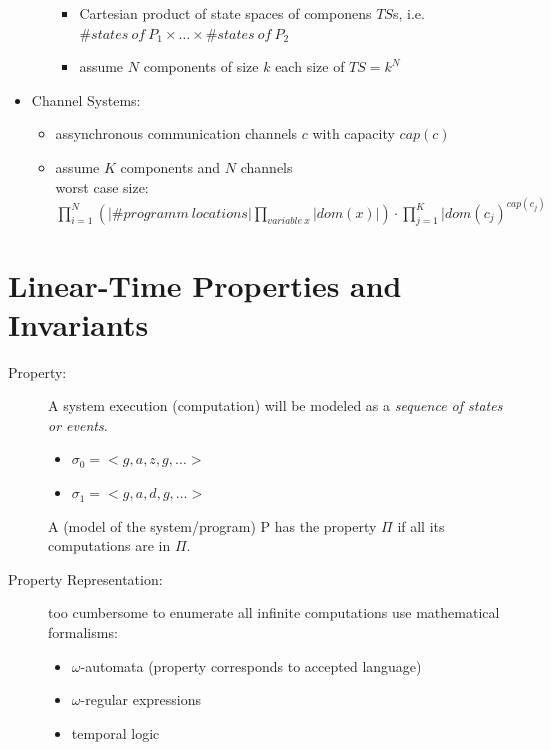 \documentclass[a4paper, 10pt]{article}
\begin{document}
\begin{itemize}
\begin{itemize}
        \begin{itemize}
            \item Cartesian product of state spaces of componens $TS$s, i.e. $\#states\ of \ P_1\times \dots \times \#states\ of \ P_2$
            \item assume $N$ components of size $k$ each \follows size of $TS=k^N$
        \end{itemize}
    \end{itemize}
    \item Channel Systems:
    \begin{itemize}
        \item assynchronous communication channels $c$ with capacity $cap(c)$
        \item assume $K$ components and $N$ channels
        \\ \follows worst case size: $\displaystyle \prod^N_{i=1} \left(|\#programm\ locations| \prod_{variable\ x} |dom(x)|\right)\cdot\prod^K_{j=1}|dom(c_j)^{cap(c_j)}$
    \end{itemize}
\end{itemize}

\section*{Linear-Time Properties and Invariants}
\begin{description}
    \item[Property:] A system execution (computation) will be modeled as a \emph{sequence of states or events}.
    \begin{itemize}
        \item $\sigma_0 = <g,a,z,g,\dots>$
        \item $\sigma_1 = <g,a,d,g,\dots>$
    \end{itemize}
    \begin{shaded}
        A (model of the system/program) P has the property $\Pi$ if all its computations are in $\Pi$.
    \end{shaded}
    \item[Property Representation:] too cumbersome to enumerate all infinite computations \follows use mathematical formalisms:
    \begin{itemize}
        \item $\omega$-automata (property corresponds to accepted language)
        \item $\omega$-regular expressions
        \item temporal logic
    \end{itemize}
\end{description}
\end{document}
